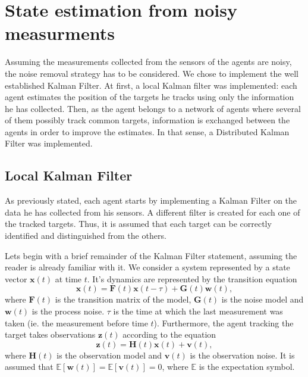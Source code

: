 \newpage
\section{State estimation from noisy measurments}
\label{Noise_removal}

Assuming the measurements collected from the sensors of the agents are noisy, the noise removal strategy has to be considered. We chose to implement the well established Kalman Filter.
At first, a local Kalman filter was implemented: each agent estimates the position of the targets he tracks using only the information he has collected. Then, as the agent belongs to a network of agents where several of them possibly track common targets, information is exchanged between the agents in order to improve the estimates. In that sense, a Distributed Kalman Filter was implemented. 

\subsection{Local Kalman Filter}

As previously stated, each agent starts by implementing a Kalman Filter on the data he has collected from his sensors. A different filter is created for each one of the tracked targets. Thus, it is assumed that each target can be correctly identified and distinguished from the others.%

Lets begin with a brief remainder of the Kalman Filter statement, assuming the reader is already familiar with it. 
We consider a system represented by a state vector $ \boldsymbol{x}(t)$ at time $t$. It's dynamics are represented by the transition equation
\begin{equation} 
\boldsymbol{x}(t) = \boldsymbol{F}(t)\boldsymbol{x}(t-\tau) + \boldsymbol{G}(t)\boldsymbol{w}(t),
\end{equation}
where $\boldsymbol{F}(t)$ is the transition matrix of the model, $\boldsymbol{G}(t)$ is the noise model and $\boldsymbol{w}(t)$ is the process noise. $\tau$ is the time at which the last measurement was taken (ie. the measurement before time $t$). Furthermore, the agent tracking the target takes observations $\boldsymbol{z}(t)$ according to the equation
\begin{equation} 
\boldsymbol{z}(t) = \boldsymbol{H}(t)\boldsymbol{x}(t) + \boldsymbol{v}(t),
\end{equation}
where $\boldsymbol{H}(t)$ is the observation model and $\boldsymbol{v}(t)$ is the observation noise.
It is assumed that $ \mathbb{E}[\boldsymbol{w}(t)] = \mathbb{E}[\boldsymbol{v}(t)] = 0 $, where $\mathbb{E}$ is the expectation symbol.


